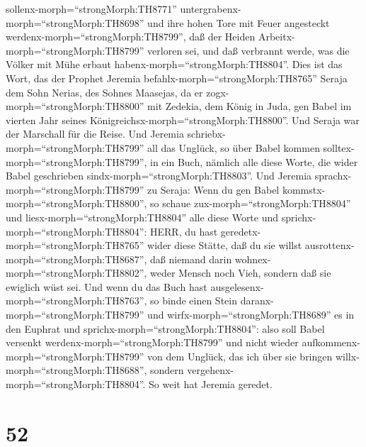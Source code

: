 sollenx-morph=``strongMorph:TH8771''
untergrabenx-morph=``strongMorph:TH8698'' und ihre hohen Tore mit Feuer
angesteckt werdenx-morph=``strongMorph:TH8799'', daß der Heiden
Arbeitx-morph=``strongMorph:TH8799'' verloren sei, und daß verbrannt
werde, was die Völker mit Mühe erbaut
habenx-morph=``strongMorph:TH8804''.  Dies ist das Wort,
das der Prophet Jeremia befahlx-morph=``strongMorph:TH8765'' Seraja dem
Sohn Nerias, des Sohnes Maasejas, da er
zogx-morph=``strongMorph:TH8800'' mit Zedekia, dem König in Juda, gen
Babel im vierten Jahr seines Königreichsx-morph=``strongMorph:TH8800''.
Und Seraja war der Marschall für die Reise.  Und Jeremia
schriebx-morph=``strongMorph:TH8799'' all das Unglück, so über Babel
kommen solltex-morph=``strongMorph:TH8799'', in ein Buch, nämlich alle
diese Worte, die wider Babel geschrieben
sindx-morph=``strongMorph:TH8803''.  Und Jeremia
sprachx-morph=``strongMorph:TH8799'' zu Seraja: Wenn du gen Babel
kommstx-morph=``strongMorph:TH8800'', so schaue
zux-morph=``strongMorph:TH8804'' und liesx-morph=``strongMorph:TH8804''
alle diese Worte  und sprichx-morph=``strongMorph:TH8804'':
HERR, du hast geredetx-morph=``strongMorph:TH8765'' wider diese Stätte,
daß du sie willst ausrottenx-morph=``strongMorph:TH8687'', daß niemand
darin wohnex-morph=``strongMorph:TH8802'', weder Mensch noch Vieh,
sondern daß sie ewiglich wüst sei.  Und wenn du das Buch
hast ausgelesenx-morph=``strongMorph:TH8763'', so binde einen Stein
daranx-morph=``strongMorph:TH8799'' und
wirfx-morph=``strongMorph:TH8689'' es in den Euphrat  und
sprichx-morph=``strongMorph:TH8804'': also soll Babel versenkt
werdenx-morph=``strongMorph:TH8799'' und nicht wieder
aufkommenx-morph=``strongMorph:TH8799'' von dem Unglück, das ich über
sie bringen willx-morph=``strongMorph:TH8688'', sondern
vergehenx-morph=``strongMorph:TH8804''. So weit hat Jeremia geredet.

\hypertarget{section-51}{%
\section{52}\label{section-51}}

